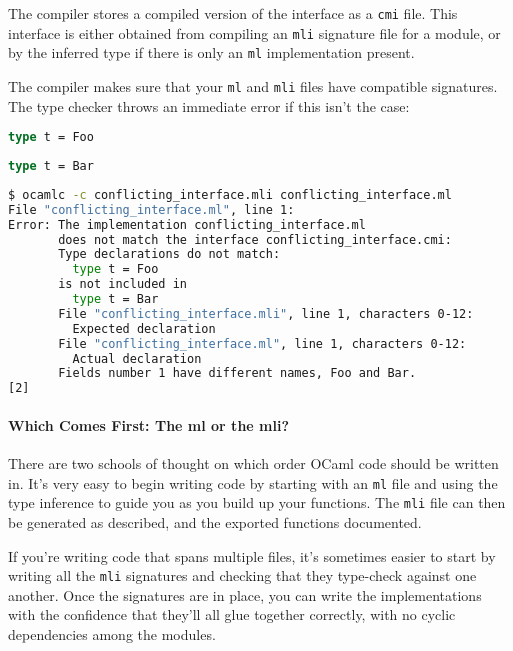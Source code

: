 The compiler stores a compiled version of the interface as a
\passthrough{\lstinline!cmi!} file. This interface is either obtained
from compiling an \passthrough{\lstinline!mli!} signature file for a
module, or by the inferred type if there is only an
\passthrough{\lstinline!ml!} implementation present.

The compiler makes sure that your \passthrough{\lstinline!ml!} and
\passthrough{\lstinline!mli!} files have compatible signatures. The type
checker throws an immediate error if this isn't the case:

\begin{lstlisting}[language=Caml]
type t = Foo
\end{lstlisting}

\begin{lstlisting}[language=Caml]
type t = Bar
\end{lstlisting}

\begin{lstlisting}[language=bash]
$ ocamlc -c conflicting_interface.mli conflicting_interface.ml
File "conflicting_interface.ml", line 1:
Error: The implementation conflicting_interface.ml
       does not match the interface conflicting_interface.cmi:
       Type declarations do not match:
         type t = Foo
       is not included in
         type t = Bar
       File "conflicting_interface.mli", line 1, characters 0-12:
         Expected declaration
       File "conflicting_interface.ml", line 1, characters 0-12:
         Actual declaration
       Fields number 1 have different names, Foo and Bar.
[2]
\end{lstlisting}

\hypertarget{which-comes-first-the-ml-or-the-mli}{%
\paragraph{Which Comes First: The ml or the
mli?}\label{which-comes-first-the-ml-or-the-mli}}

There are two schools of thought on which order OCaml code should be
written in. It's very easy to begin writing code by starting with an
\passthrough{\lstinline!ml!} file and using the type inference to guide
you as you build up your functions. The \passthrough{\lstinline!mli!}
file can then be generated as described, and the exported functions
documented.

If you're writing code that spans multiple files, it's sometimes easier
to start by writing all the \passthrough{\lstinline!mli!} signatures and
checking that they type-check against one another. Once the signatures
are in place, you can write the implementations with the confidence that
they'll all glue together correctly, with no cyclic dependencies among
the modules.

